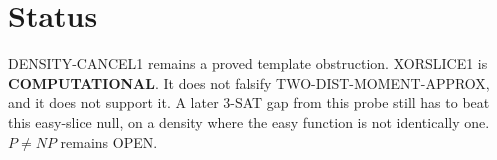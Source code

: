 \documentclass[11pt]{article}
\begin{document}
\section{Status}
DENSITY-CANCEL1 remains a proved template obstruction. XORSLICE1 is \textbf{COMPUTATIONAL}. It does not falsify TWO-DIST-MOMENT-APPROX, and it does not support it. A later 3-SAT gap from this probe still has to beat this easy-slice null, on a density where the easy function is not identically one. \(P\ne NP\) remains OPEN.
\end{document}
